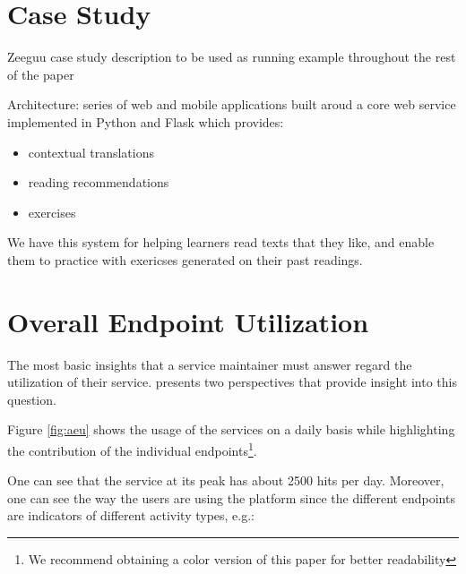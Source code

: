 \documentclass[conference]{IEEEtran}
\begin{document}



\section{Case Study}

Zeeguu case study description to be used as running example throughout the rest of the paper \cite{Lungu16}

Architecture: series of web and mobile applications built aroud a core web service implemented in Python and Flask which provides: 
\begin{itemize}
  \item contextual translations 
  \item reading recommendations
  \item exercises
\end{itemize}

We have this system for helping learners read texts that they like, and enable them to practice with exericses generated on their past readings.



\section{Overall Endpoint Utilization}

  The most basic insights that a service maintainer must answer regard the utilization of their service. \tool presents two perspectives that provide insight into this question. 


  Figure \ref{fig:aeu} shows the usage of the services on a daily basis while highlighting the contribution of the individual endpoints\footnote{We recommend obtaining a color version of this paper for better readability}. 

  One can see that the service at its peak has about 2500 hits per day. Moreover, one can see the way the users are using the platform since the different endpoints are indicators of different activity types, e.g.: 
\end{document}
